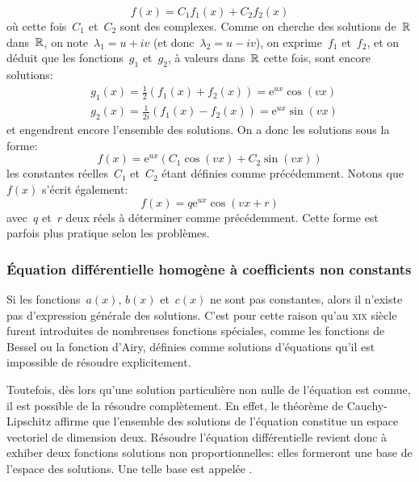 \begin{enumerate}
\begin{equation}
f(x) = C_1f_1(x) + C_2f_2(x)
\end{equation}
où cette fois~$C_1$ et~$C_2$ sont des complexes. Comme on cherche des solutions de~$\mathbb R$ dans~$\mathbb R$, on note~$\lambda_1 = u + iv$ (et donc~$\lambda_2 = u -iv$), on exprime~$f_1$ et~$f_2$, et on déduit que les fonctions~$g_1$ et~$g_2$, à valeurs dans~$\mathbb R$ cette fois, sont encore solutions:
\begin{align}
&g_1(x) =\frac 12 (f_1(x) + f_2(x) )= \mathrm{e}^{ux}\cos(vx)\\
&g_2(x) = \frac{1}{2i}(f_1(x) - f_2(x)) = \mathrm{e}^{ux}\sin(vx)
\end{align}
et engendrent encore l'ensemble des solutions. On a donc les solutions sous la forme:
\begin{equation}
f(x) = \mathrm{e}^{ux}(C_1\cos(vx) + C_2\sin(vx))
\end{equation}
les constantes réelles~$C_1$ et~$C_2$ étant définies comme précédemment. Notons que~$f(x)$ s'écrit également:
\begin{equation}
f(x) = q \mathrm{e}^{ux}\cos(vx+r)
\end{equation}
avec~$q$ et~$r$ deux réels à déterminer comme précédemment. Cette forme est parfois plus pratique selon les problèmes. 
\end{enumerate}

\medskip
\subsubsection{Équation différentielle homogène à coefficients non constants}

Si les fonctions~$a(x)$, $b(x)$ et~$c(x)$ ne sont pas constantes, alors il n'existe pas d'expression générale des solutions. C'est pour cette raison qu'au \textsc{xix} siècle furent introduites de nombreuses fonctions spéciales, comme les fonctions de Bessel ou la fonction d'Airy, définies comme solutions d'équations qu'il est impossible de résoudre explicitement. 

Toutefois, dès lors qu'une solution particulière non nulle de l'équation est connue, il est possible de la résoudre complètement. En effet, le théorème de Cauchy-Lipschitz affirme que l'ensemble des solutions de l'équation constitue un espace vectoriel de dimension deux. Résoudre l'équation différentielle revient donc à exhiber deux fonctions solutions non proportionnelles: elles formeront une base de l'espace des solutions. Une telle base est appelée . 

